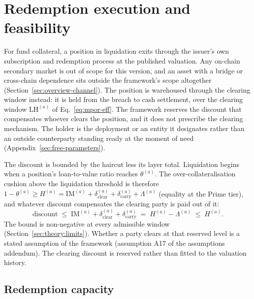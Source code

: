 \section{Redemption execution and feasibility}\label{sec:efficacy}

For fund collateral, a position in liquidation exits through the issuer's own subscription and redemption
process at the published valuation. Any on-chain secondary market is out of scope for this version, and an asset with a bridge or cross-chain dependence sits outside the framework's scope altogether (Section~\ref{sec:overview-channel}). The position is warehoused through the clearing window instead: it is held from
the breach to cash settlement, over the clearing window $\mathrm{LH}^{(a)}$
of Eq.~\eqref{eq:mpor-eff}. The framework reserves
the discount that compensates whoever clears the position, and it does not prescribe the
clearing mechanism. The holder is the deployment or an entity it designates rather than an
outside counterparty standing ready at the moment of need
(Appendix~\ref{sec:free-parameters}).

The discount is bounded by the haircut less its layer total. Liquidation
begins when a position's loan-to-value ratio reaches $\theta^{(a)}$. The
over-collateralisation cushion above the liquidation threshold is
therefore $1-\theta^{(a)} \ge H^{(a)} = \mathrm{IM}^{(a)} +
\delta_{\mathrm{clear}}^{(a)} + \delta_{\mathrm{carry}}^{(a)} + \Lambda^{(a)}$ (equality at the
Prime tier), and whatever discount compensates the clearing party is paid out of it:
\begin{equation}\label{eq:clearing-solvency}
\mathrm{discount} \;\le\; \mathrm{IM}^{(a)} + \delta_{\mathrm{clear}}^{(a)} + \delta_{\mathrm{carry}}^{(a)}
\;=\; H^{(a)} - \Lambda^{(a)} \;\le\; H^{(a)} .
\end{equation}
The bound is non-negative at every admissible
window (Section~\ref{sec:theory:limits}). Whether a party clears at that reserved
level is a stated assumption of the framework (assumption A17 of the assumptions addendum).
The clearing discount is reserved rather than fitted to the valuation history.

\subsection{Redemption capacity}\label{sec:redemption_capacity}

